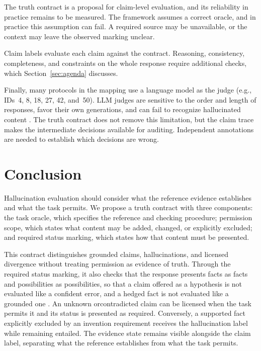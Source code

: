 \documentclass{clv2025}
\begin{document}
The truth contract is a proposal for claim-level evaluation, and its
reliability in practice remains to be measured. The framework assumes a
correct oracle, and in practice this assumption can fail. A required source
may be unavailable, or the context may leave the observed marking unclear.


Claim labels evaluate each claim against the contract. Reasoning,
consistency, completeness, and constraints on the whole response require
additional checks, which Section~\ref{sec:agenda} discusses.

Finally, many protocols in the mapping use a language model as the judge
(e.g., IDs~4, 8, 18, 27, 42, and~50). LLM judges are sensitive to the order
and length of responses, favor their own generations, and can fail to
recognize hallucinated content
\citep{wang_fair_2024,zheng_judging_2023,panickssery_llm_2024,li_halueval_2023,gu_survey_2024}.
The truth contract does not remove this limitation, but the claim trace
makes the intermediate decisions available for auditing. Independent
annotations are needed to establish which decisions are wrong.

\section{Conclusion}\label{sec:conclusion}

Hallucination evaluation should consider what the reference evidence
establishes and what the task permits. We propose a truth contract with
three components: the task oracle, which specifies the reference and checking
procedure; permission scope, which states what content may be added, changed,
or explicitly excluded; and required status marking, which states how that content must
be presented.

This contract distinguishes grounded claims, hallucinations, and licensed
divergence without treating permission as evidence of truth. Through the
required status marking, it also checks that the response presents facts
as facts and possibilities as possibilities, so that a claim offered as a
hypothesis is not evaluated like a confident error, and a hedged fact is
not evaluated like a grounded one \citep{yona_metacognition_2026}. An unknown orcontradicted claim can be licensed when the task permits it and its status
is presented as required. Conversely, a supported fact explicitly excluded
by an invention requirement receives the hallucination label while remaining
entailed. The evidence state remains visible alongside the claim label,
separating what the reference establishes from what the task permits.
\end{document}
